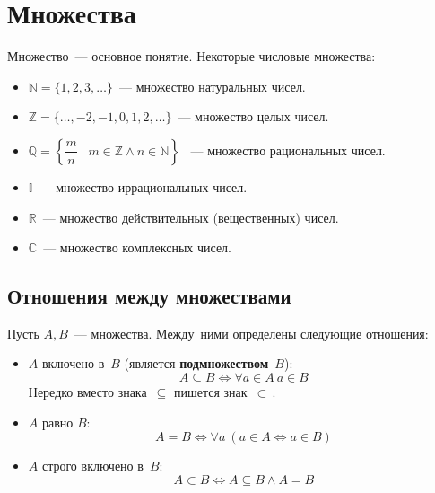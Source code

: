 \section{Множества}
	Множество~--- основное понятие. Некоторые числовые множества:
\begin{itemize}
	\item $\mathbb N = \{ 1, 2, 3, \dots \}$~--- множество натуральных чисел.
	\item $\mathbb Z = \{ \dots, -2, -1, 0, 1, 2, \dots \}$~--- множество целых чисел.
	\item $\mathbb Q = \left\{ \dfrac{m}n \mid m \in \mathbb Z \land n \in \mathbb N \right\}$
	~--- множество рациональных чисел.
	\item $\mathbb I$~--- множество иррациональных чисел.
	\item $\mathbb R$~--- множество действительных (вещественных) чисел.
	\item $\mathbb C$~--- множество комплексных чисел.
\end{itemize}

\subsection{Отношения между множествами}
	Пусть $A, B$~--- множества. Между~ними определены следующие отношения:
\begin{itemize}
	\item $A$ включено в~$B$ (является \textbf{подмножеством}~$B$):
	\[ A \subseteq B \Leftrightarrow \forall a \in A \ a \in B \]
	Нередко вместо знака~$\subseteq$ пишется знак~$\subset$\,.
	\item $A$ равно $B$:
	\[ A = B \Leftrightarrow \forall a \ (a \in A \Leftrightarrow a \in B) \]
	\item $A$ строго включено в~$B$:
	\[ A \subset B \Leftrightarrow A \subseteq B \land A = B \]
\end{itemize}

